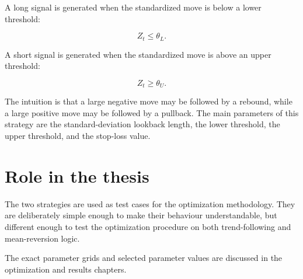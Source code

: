 A long signal is generated when the standardized move is below a lower threshold:

\[
Z_t \leq \theta_L.
\]

A short signal is generated when the standardized move is above an upper threshold:

\[
Z_t \geq \theta_U.
\]

The intuition is that a large negative move may be followed by a rebound, while a large positive
move may be followed by a pullback. The main parameters of this strategy are the standard-deviation
lookback length, the lower threshold, the upper threshold, and the stop-loss value.

\section{Role in the thesis}

The two strategies are used as test cases for the optimization methodology. They are deliberately
simple enough to make their behaviour understandable, but different enough to test the optimization
procedure on both trend-following and mean-reversion logic.

The exact parameter grids and selected parameter values are discussed in the optimization and
results chapters.
